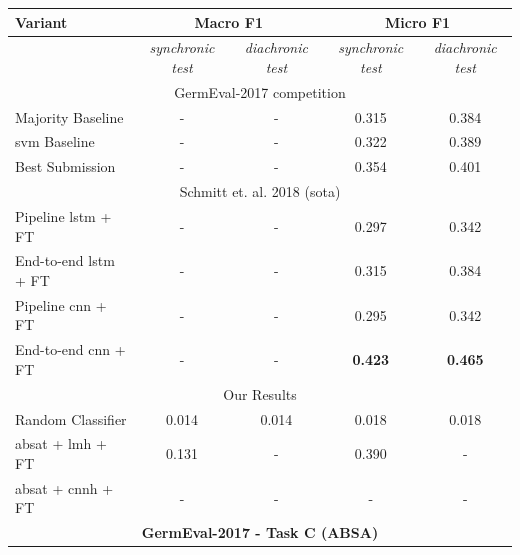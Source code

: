 \begin{table}[htp]
	\centering
	\begin{tabular*}{\textwidth}{l@{\extracolsep{\fill}}cccc@{}}
	\toprule
	Variant          & \multicolumn{2}{c}{\textbf{Macro F1}}     & \multicolumn{2}{c}{\textbf{Micro F1}}       \\ 
	\midrule
					 & \textit{synchronic test}      	& \textit{diachronic test} 		& \textit{synchronic test}      		& \textit{diachronic test} 		\\
	\midrule
								 \multicolumn{5}{c}{GermEval-2017 competition \cite{Wojatzki2017}} 					\\
	Majority Baseline        		 &  -        	&  -    	& 0.315        	&   0.384 							\\
	\gls{svm} Baseline        		 &  -        	&  -    	& 0.322        	&   0.389 							\\
	Best Submission 				 &  - 			&  - 		& 0.354 		& 0.401 							\\
	\midrule
								 \multicolumn{5}{c}{Schmitt et. al. 2018 {(\gls{sota})} \cite{Schmitt2018}} 		\\
	Pipeline \gls{lstm} + FT 		 & -        	& -    		& 0.297     	&   0.342							\\
	End-to-end \gls{lstm} + FT 		 & -        	& -    		& 0.315     	&   0.384 							\\
	Pipeline \gls{cnn} + FT 		 & -        	& -    		& 0.295     	&   0.342 							\\
	End-to-end \gls{cnn} + FT 		 & -        	& -    		& \textbf{0.423}&   \textbf{0.465} 					\\
	\midrule
								 \multicolumn{5}{c}{Our Results} 													\\

	Random Classifier          		 &  0.014   	& 0.014 	&  0.018  		&   0.018  							\\
	\gls{absat} + \gls{lmh} + FT     & 0.131        & -			&  0.390    	&   -   							\\ 
	\gls{absat} + \gls{cnnh} + FT    & -         	& -			&  -        	&   -   							\\ 
	\bottomrule
	\multicolumn{5}{c}{\textbf{GermEval-2017 - Task C {(ABSA)}}} \\


\end{tabular*}
\end{table}
